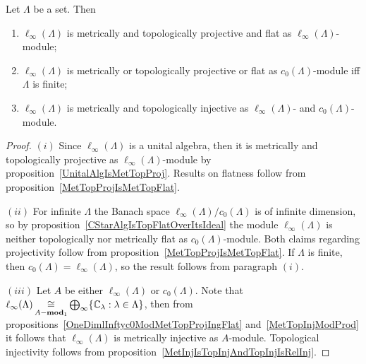 \begin{proposition}\label{c0AndlInftyModlIfty} Let $\Lambda$ be a set. Then

\begin{enumerate}[label = (\roman*)]
    \item $\ell_\infty(\Lambda)$ is metrically and topologically projective 
    and flat as $\ell_\infty(\Lambda)$-module;

    \item $\ell_\infty(\Lambda)$ is metrically or topologically projective 
    or flat as $c_0(\Lambda)$-module iff $\Lambda$ is finite;

    \item $\ell_\infty(\Lambda)$ is metrically and topologically injective as
    $\ell_\infty(\Lambda)$- and $c_0(\Lambda)$-module.
\end{enumerate}
\end{proposition}
\begin{proof} $(i)$ Since $\ell_\infty(\Lambda)$ is a unital algebra, then it is
metrically and topologically projective as $\ell_\infty(\Lambda)$-module by
proposition~\ref{UnitalAlgIsMetTopProj}. Results on flatness follow from
proposition~\ref{MetTopProjIsMetTopFlat}.

$(ii)$ For infinite $\Lambda$ the Banach space
$\ell_\infty(\Lambda)/c_0(\Lambda)$ is of infinite dimension, so by
proposition~\ref{CStarAlgIsTopFlatOverItsIdeal} the module
$\ell_\infty(\Lambda)$ is neither topologically nor metrically flat as
$c_0(\Lambda)$-module. Both claims regarding projectivity follow from
proposition~\ref{MetTopProjIsMetTopFlat}. If $\Lambda$ is finite, then
$c_0(\Lambda)=\ell_\infty(\Lambda)$, so the result follows from paragraph $(i)$.

$(iii)$ Let $A$ be either $\ell_\infty(\Lambda)$ or $c_0(\Lambda)$. Note that
$\ell_\infty(\Lambda)
\mathop{\mathbin{\cong}}\limits_{A-\mathbf{mod}_1}
\bigoplus_\infty \{\mathbb{C}_\lambda:\lambda\in\Lambda \}$, then from
propositions~\ref{OneDimlInftyc0ModMetTopProjIngFlat} and~\ref{MetTopInjModProd}
it follows that $\ell_\infty(\Lambda)$ is metrically injective as $A$-module.
Topological injectivity follows from
proposition~\ref{MetInjIsTopInjAndTopInjIsRelInj}.
\end{proof}

